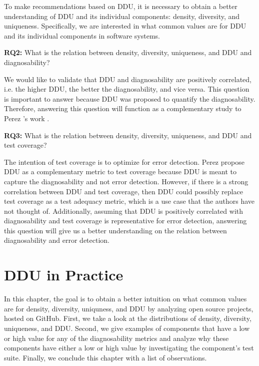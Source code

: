 \documentclass[twoside,a4paper,11pt]{memoir}
\begin{document}
To make recommendations based on DDU, it is necessary to obtain a better understanding of DDU and its individual components: density, diversity, and uniqueness.
Specifically, we are interested in what common values are for DDU and its individual components in software systems.

\begin{framed}
\noindent
\textbf{RQ2:} What is the relation between density, diversity, uniqueness, and DDU and diagnosability?
\end{framed}

We would like to validate that DDU and diagnosability are positively correlated, i.e. the higher DDU, the better the diagnosability, and vice versa.
This question is important to answer because DDU was proposed to quantify the diagnosability.
Therefore, answering this question will function as a complementary study to Perez \etal's work \cite{DBLP:conf/icse/PerezAD17}.

\begin{framed}
\noindent
\textbf{RQ3:} What is the relation between density, diversity, uniqueness, and DDU and test coverage?
\end{framed}

The intention of test coverage is to optimize for error detection.
Perez \etal propose DDU as a complementary metric to test coverage \cite{DBLP:conf/icse/PerezAD17} because DDU is meant to capture the diagnosability and not error detection.
However, if there is a strong correlation between DDU and test coverage, then DDU could possibly replace test coverage as a test adequacy metric, which is a use case that the authors have not thought of.
Additionally, assuming that DDU is positively correlated with diagnosability and test coverage is representative for error detection, answering this question will give us a better understanding on the relation between diagnosability and error detection.


\chapter{DDU in Practice}
\label{ch:rq1}
In this chapter, the goal is to obtain a better intuition on what common values are for density, diversity, uniquness, and DDU by analyzing open source projects, hosted on GitHub.
First, we take a look at the distributions of density, diversity, uniqueness, and DDU.
Second, we give examples of components that have a low or high value for any of the diagnosability metrics and analyze why these components have either a low or high value by investigating the component's test suite.
Finally, we conclude this chapter with a list of observations.
\end{document}
